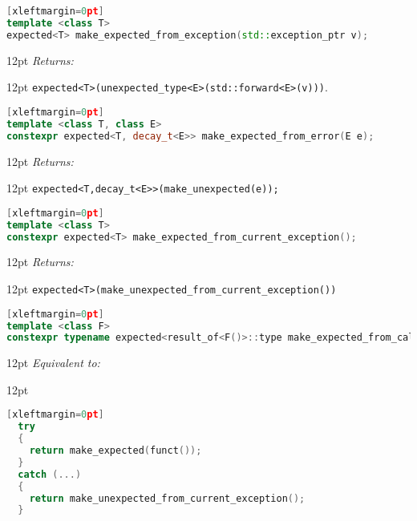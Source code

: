 \documentclass[a4paper,10pt]{article}
\newcommand{\cpp}[1]{\lstinline{#1}}
\newcommand{\wordingItem}[1]{\noindent\textit{#1:}}
\newenvironment{wordingTextItem}[1]{\wordingItem{#1}\vspace{2pt}\noindent\begin{adjustwidth}{12pt}{}}{\vspace{2pt}\end{adjustwidth}}
\newenvironment{wordingPara}{\begin{adjustwidth}{12pt}{}}{\end{adjustwidth}}
\begin{document}
\begin{lstlisting}[language=C++][xleftmargin=0pt]
template <class T>
expected<T> make_expected_from_exception(std::exception_ptr v); 
\end{lstlisting}
\begin{wordingPara}
\begin{wordingTextItem}{Returns}
\cpp{expected<T>(unexpected_type<E>(std::forward<E>(v)))}.
\end{wordingTextItem}
\end{wordingPara}

\begin{lstlisting}[language=C++][xleftmargin=0pt]
template <class T, class E>
constexpr expected<T, decay_t<E>> make_expected_from_error(E e);
\end{lstlisting}
\begin{wordingPara}
\begin{wordingTextItem}{Returns}
\cpp{expected<T,decay_t<E>>(make_unexpected(e));}
\end{wordingTextItem}
\end{wordingPara}


\begin{lstlisting}[language=C++][xleftmargin=0pt]
template <class T>
constexpr expected<T> make_expected_from_current_exception(); 
\end{lstlisting}
\begin{wordingPara}
\begin{wordingTextItem}{Returns}
\cpp{expected<T>(make_unexpected_from_current_exception())}
\end{wordingTextItem}
\end{wordingPara}

\begin{lstlisting}[language=C++][xleftmargin=0pt]
template <class F>
constexpr typename expected<result_of<F()>::type make_expected_from_call(F funct);
\end{lstlisting}
\begin{wordingPara}
\begin{wordingTextItem}{Equivalent to}
\begin{lstlisting}[language=C++][xleftmargin=0pt]
  try
  {
    return make_expected(funct());
  }
  catch (...)
  {
    return make_unexpected_from_current_exception();
  }
\end{lstlisting}
\end{wordingTextItem}
\end{wordingPara}
\end{document}
